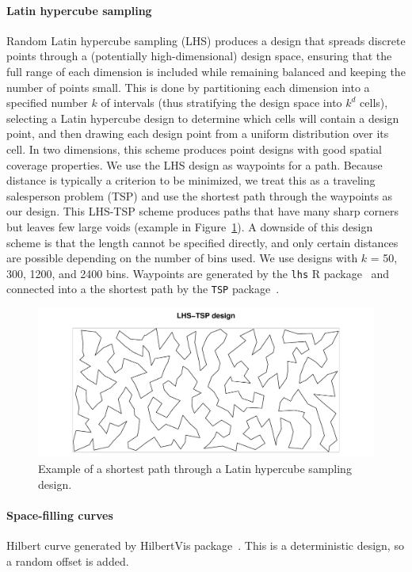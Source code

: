 \documentclass[review]{elsarticle}
\begin{document}
\paragraph{Latin hypercube sampling}
Random Latin hypercube sampling (LHS) produces a design that spreads discrete
points through a (potentially high-dimensional) design space, ensuring that
the full range of each dimension is included while remaining balanced and
keeping the number of points small. This is done by partitioning each dimension
into a specified number \(k\) of intervals (thus stratifying the design space
into \(k^{d}\) cells), selecting a Latin hypercube design to determine which
cells will contain a design point, and then drawing each design point from a
uniform distribution over its cell. In two dimensions, this scheme produces
point designs with good spatial coverage properties. We use the LHS design as
waypoints for a path. Because distance is typically a criterion to be
minimized, we treat this as a traveling salesperson problem (TSP) and use the
shortest path through the waypoints as our design. This LHS-TSP scheme produces
paths that have many sharp corners but leaves few large voids (example in
Figure~\ref{lhstsp000161}). A downside of this design scheme is that the length
cannot be specified directly, and only certain distances are possible depending
on the number of bins used. We use designs with \(k\) = 50, 300, 1200,
and 2400 bins. Waypoints are generated by the \texttt{lhs} R package~\cite{lhs}
and connected into a the shortest path by the \texttt{TSP} package~\citep{tsp}.

\begin{figure}
\includegraphics[width=5in]{LHS-TSP000161.pdf}
\caption{Example of a shortest path through a Latin hypercube sampling design.}
\label{lhstsp000161}
\end{figure}

\paragraph{Space-filling curves}
Hilbert curve generated by HilbertVis package~\citep{hilbertvis}. This is a
deterministic design, so a random offset is added.
\end{document}
